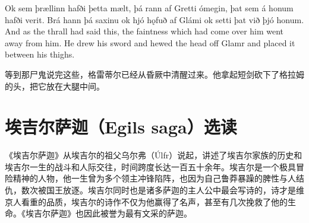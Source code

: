\begin{paracol}{2}
    Ok sem þrællinn hafði þetta mælt, þá rann af Gretti ómegin, þat sem á honum hafði verit. Brá hann þá saxinu ok hjó hǫfuð af Glámi ok setti þat við þjó honum.
    \switchcolumn
    And as the thrall had said this, the faintness which had come over him went away from him. He drew his sword and hewed the head off Glamr and placed it between his thighs.
\end{paracol}
\begin{translation*}{}
    等到那尸鬼说完这些，格雷蒂尔已经从昏厥中清醒过来。他拿起短剑砍下了格拉姆的头，把它放在大腿中间。
\end{translation*}

\section{埃吉尔萨迦（Egils saga）选读}
《埃吉尔萨迦》从埃吉尔的祖父乌尔弗（Úlfr）说起，讲述了埃吉尔家族的历史和埃吉尔一生的战斗和人际交往，时间跨度长达一百五十余年。埃吉尔是一个极具冒险精神的人物，他一生曾为多个领主冲锋陷阵，也因为自己鲁莽暴躁的脾性与人结仇，数次被国王放逐。埃吉尔同时也是诸多萨迦的主人公中最会写诗的，诗才是维京人看重的品质，埃吉尔的诗作不仅为他赢得了名声，甚至有几次挽救了他的生命。《埃吉尔萨迦》也因此被誉为最有文采的萨迦。


